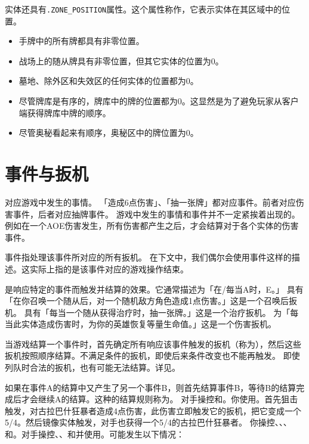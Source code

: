 实体还具有\texttt{.ZONE\_POSITION}属性。这个属性称作，它表示实体在其区域中的位置。
\begin{itemize}
    \item 手牌中的所有牌都具有非零位置。
    \item 战场上的随从牌具有非零位置，但其它实体的位置为0。
    \item 墓地、除外区和失效区的任何实体的位置都为0。
    \item 尽管牌库是有序的，牌库中的牌的位置都为0。这显然是为了避免玩家从客户端获得牌库中牌的顺序。
    \item 尽管奥秘看起来有顺序，奥秘区中的牌位置为0。
\end{itemize}

\section{事件与扳机}
\label{event-and-trigger}

对应游戏中发生的事情。
\example 「造成6点伤害」、「抽一张牌」都对应事件。前者对应伤害事件，后者对应抽牌事件。
\notice 游戏中发生的事情和事件并不一定紧挨着出现的。例如在一个AOE伤害发生，所有伤害都产生之后，才会结算对于各个实体的伤害事件。

事件指处理该事件所对应的所有扳机。
\notice 在下文中，我们偶尔会使用事件这样的描述。这实际上指的是该事件对应的游戏操作结束。

是响应特定的事件而触发并结算的效果。它通常描述为「在/每当A时，E。」
\example {}具有「在你召唤一个随从后，对一个随机敌方角色造成1点伤害。」这是一个召唤后扳机。
\example {}具有「每当一个随从获得治疗时，抽一张牌。」这是一个治疗扳机。
\example {}为「每当此实体造成伤害时，为你的英雄恢复等量生命值。」这是一个伤害扳机。

当游戏结算一个事件时，首先确定所有响应该事件触发的扳机（称为），然后这些扳机按照顺序结算。不满足条件的扳机，即使后来条件改变也不能再触发。
\notice 即使列队时合法的扳机，也有可能无法结算。详见。

如果在事件A的结算中又产生了另一个事件B，则首先结算事件B，等待B的结算完成后才会继续A的结算。这种的结算规则称为。
\example 对手操控和。你使用。首先狙击触发，对古拉巴什狂暴者造成4点伤害，此伤害立即触发它的扳机，把它变成一个5/4。然后镜像实体触发，对手也获得一个5/4的古拉巴什狂暴者。
\example 你操控、、、和。对手操控、、和并使用。可能发生以下情况：

